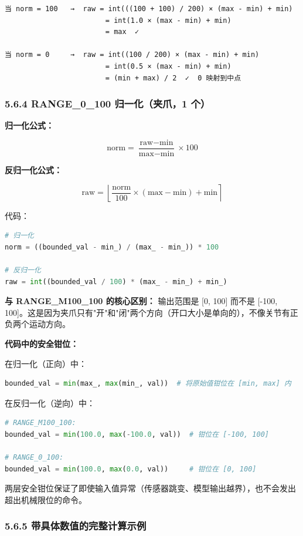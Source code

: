 \documentclass[UTF8,a4paper,11pt]{ctexart}
\begin{document}
{\begin{lstlisting}[language=text]
当 norm = 100   →  raw = int(((100 + 100) / 200) × (max - min) + min)
                        = int(1.0 × (max - min) + min)
                        = max  ✓

当 norm = 0     →  raw = int((100 / 200) × (max - min) + min)
                        = int(0.5 × (max - min) + min)
                        = (min + max) / 2  ✓  0 映射到中点
\end{lstlisting}

\subsubsection{5.6.4 RANGE_0_100 归一化（夹爪，1 个）}

\textbf{归一化公式：}

$$\text{norm} = \frac{\text{raw} - \text{min}}{\text{max} - \text{min}} \times 100$$

\textbf{反归一化公式：}

$$\text{raw} = \left\lfloor \frac{\text{norm}}{100} \times (\text{max} - \text{min}) + \text{min} \right\rceil$$

代码：
\begin{lstlisting}[language=python]
# 归一化
norm = ((bounded_val - min_) / (max_ - min_)) * 100

# 反归一化
raw = int((bounded_val / 100) * (max_ - min_) + min_)
\end{lstlisting}

\textbf{与 RANGE_M100_100 的核心区别：} 输出范围是 [0, 100] 而不是 [-100, 100]。这是因为夹爪只有"开"和"闭"两个方向（开口大小是单向的），不像关节有正负两个运动方向。

\textbf{代码中的安全钳位：}

在归一化（正向）中：
\begin{lstlisting}[language=python]
bounded_val = min(max_, max(min_, val))  # 将原始值钳位在 [min, max] 内
\end{lstlisting}

在反归一化（逆向）中：
\begin{lstlisting}[language=python]
# RANGE_M100_100:
bounded_val = min(100.0, max(-100.0, val))  # 钳位在 [-100, 100]

# RANGE_0_100:
bounded_val = min(100.0, max(0.0, val))     # 钳位在 [0, 100]
\end{lstlisting}

两层安全钳位保证了即使输入值异常（传感器跳变、模型输出越界），也不会发出超出机械限位的命令。

\subsubsection{5.6.5 带具体数值的完整计算示例}

}
\end{document}
